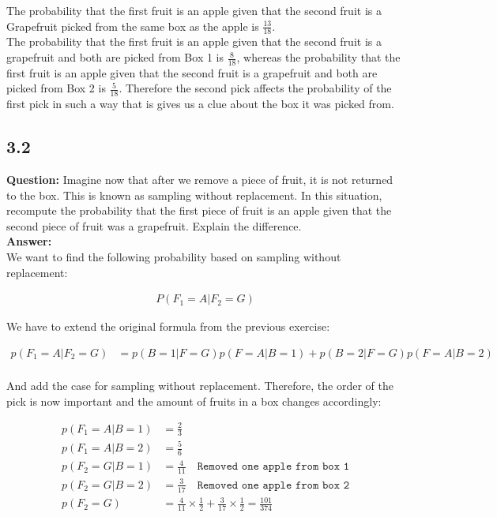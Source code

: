 \documentclass[a4paper]{article}
\begin{document}
The probability that the first fruit is an apple given that the second fruit is a Grapefruit picked from the same box as the apple is $\frac{13}{18}$.\\
The probability that the first fruit is an apple given that the second fruit is a grapefruit and both are picked from Box 1 is $\frac{8}{18}$, whereas the probability that the first fruit is an apple given that the second fruit is a grapefruit and both are picked from Box 2 is $\frac{5}{18}$. Therefore the second pick affects the probability of the first pick in such a way that is gives us a clue about the box it was picked from.

\subsection*{3.2}


\textbf{Question:} Imagine now that after we remove a piece of fruit, it is not returned to the box. This is known as sampling without replacement. In this situation, recompute the probability that the first piece of fruit is an apple given that the second piece of fruit was a grapefruit. Explain the difference.\\

\textbf{Answer:}\\

We want to find the following probability based on sampling without replacement:

\begin{align*}
	P(F_1 = A | F_2 = G)
\end{align*}

We have to extend the original formula from the previous exercise:

\begin{align*}
	p(F_1 = A | F_2 = G) &= p(B = 1| F = G)p(F = A | B = 1) + p(B = 2 | F = G)p(F = A | B = 2)\\
\end{align*}

And add the case for sampling without replacement. Therefore, the order of the pick is now important and the amount of fruits in a box changes accordingly:

\begin{align*}
	p(F_1 = A | B = 1) &= \frac{2}{3}\\
	p(F_1 = A | B = 2) &= \frac{5}{6}\\
	p(F_2 = G | B = 1) &= \frac{4}{11}  \quad \texttt{Removed one apple from box 1}\\
	p(F_2 = G | B = 2) &= \frac{3}{17} \quad \texttt{Removed one apple from box 2}\\
		p(F_2 = G) &= \frac{4}{11} \times \frac{1}{2} + \frac{3}{17} \times \frac{1}{2} = \frac{101}{374}
\end{align*}
\end{document}
